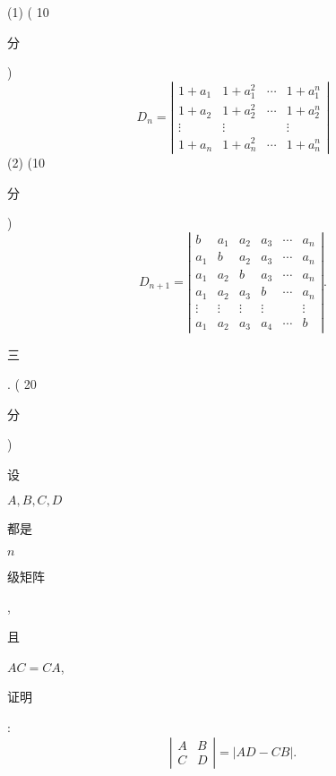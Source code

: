 \documentclass[10pt]{article}
\begin{document}
(1) ( 10 \begin{CJK}{UTF8}{mj}分\end{CJK})
$$
D_{n}=\left|\begin{array}{cccc}
1+a_{1} & 1+a_{1}^{2} & \cdots & 1+a_{1}^{n} \\
1+a_{2} & 1+a_{2}^{2} & \cdots & 1+a_{2}^{n} \\
\vdots & \vdots & & \vdots \\
1+a_{n} & 1+a_{n}^{2} & \cdots & 1+a_{n}^{n}
\end{array}\right|
$$
(2) (10 \begin{CJK}{UTF8}{mj}分\end{CJK})
$$
D_{n+1}=\left|\begin{array}{cccccc}
b & a_{1} & a_{2} & a_{3} & \cdots & a_{n} \\
a_{1} & b & a_{2} & a_{3} & \cdots & a_{n} \\
a_{1} & a_{2} & b & a_{3} & \cdots & a_{n} \\
a_{1} & a_{2} & a_{3} & b & \cdots & a_{n} \\
\vdots & \vdots & \vdots & \vdots & & \vdots \\
a_{1} & a_{2} & a_{3} & a_{4} & \cdots & b
\end{array}\right| .
$$
\begin{CJK}{UTF8}{mj}三\end{CJK}. ( 20 \begin{CJK}{UTF8}{mj}分\end{CJK}) \begin{CJK}{UTF8}{mj}设\end{CJK} $A, B, C, D$ \begin{CJK}{UTF8}{mj}都是\end{CJK} $n$ \begin{CJK}{UTF8}{mj}级矩阵\end{CJK}, \begin{CJK}{UTF8}{mj}且\end{CJK} $A C=C A$, \begin{CJK}{UTF8}{mj}证明\end{CJK}:
$$
\left|\begin{array}{ll}
A & B \\
C & D
\end{array}\right|=|A D-C B| .
$$
\end{document}

